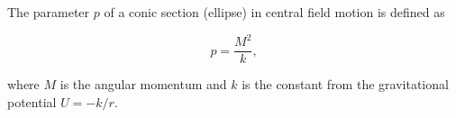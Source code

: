 The parameter $p$ of a conic section (ellipse) in central field motion is defined as

$$p = \frac{M^2}{k},$$

where $M$ is the angular momentum and $k$ is the constant from the gravitational potential $U = -k/r$.
